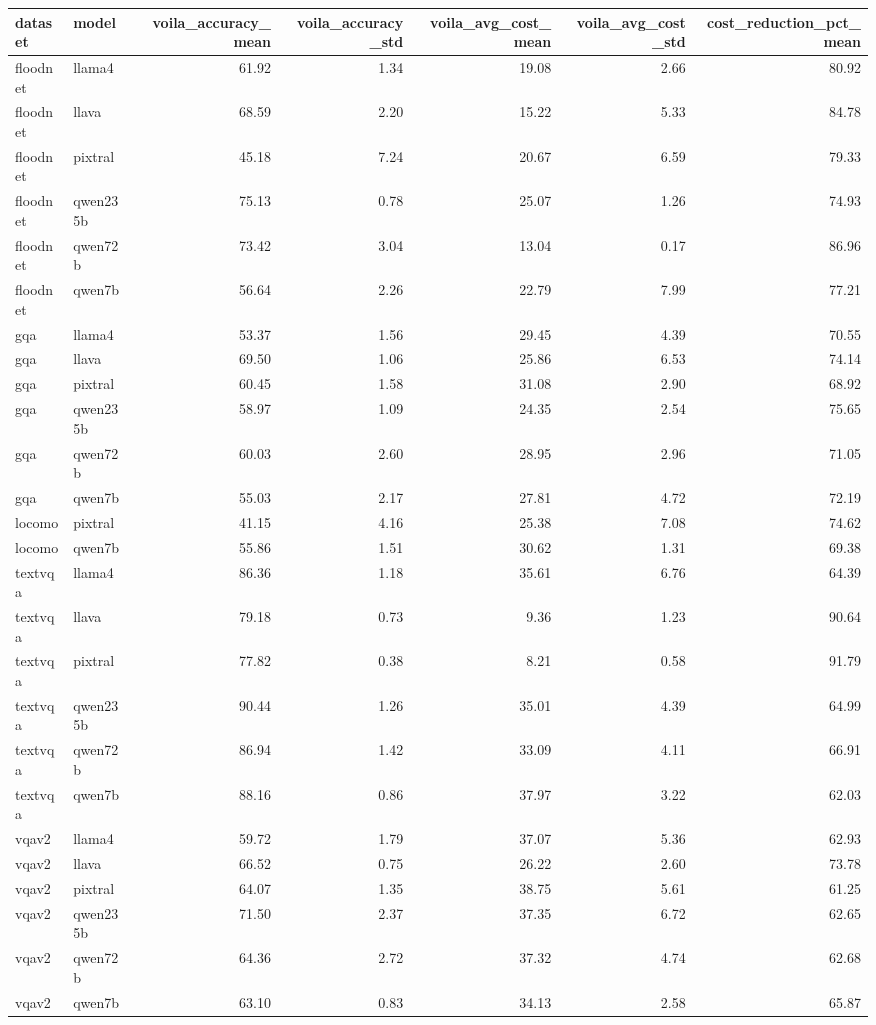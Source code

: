 \begin{tabular}{llrrrrr}
\toprule
dataset & model & voila_accuracy_mean & voila_accuracy_std & voila_avg_cost_mean & voila_avg_cost_std & cost_reduction_pct_mean \\
\midrule
floodnet & llama4 & 61.92 & 1.34 & 19.08 & 2.66 & 80.92 \\
floodnet & llava & 68.59 & 2.20 & 15.22 & 5.33 & 84.78 \\
floodnet & pixtral & 45.18 & 7.24 & 20.67 & 6.59 & 79.33 \\
floodnet & qwen235b & 75.13 & 0.78 & 25.07 & 1.26 & 74.93 \\
floodnet & qwen72b & 73.42 & 3.04 & 13.04 & 0.17 & 86.96 \\
floodnet & qwen7b & 56.64 & 2.26 & 22.79 & 7.99 & 77.21 \\
gqa & llama4 & 53.37 & 1.56 & 29.45 & 4.39 & 70.55 \\
gqa & llava & 69.50 & 1.06 & 25.86 & 6.53 & 74.14 \\
gqa & pixtral & 60.45 & 1.58 & 31.08 & 2.90 & 68.92 \\
gqa & qwen235b & 58.97 & 1.09 & 24.35 & 2.54 & 75.65 \\
gqa & qwen72b & 60.03 & 2.60 & 28.95 & 2.96 & 71.05 \\
gqa & qwen7b & 55.03 & 2.17 & 27.81 & 4.72 & 72.19 \\
locomo & pixtral & 41.15 & 4.16 & 25.38 & 7.08 & 74.62 \\
locomo & qwen7b & 55.86 & 1.51 & 30.62 & 1.31 & 69.38 \\
textvqa & llama4 & 86.36 & 1.18 & 35.61 & 6.76 & 64.39 \\
textvqa & llava & 79.18 & 0.73 & 9.36 & 1.23 & 90.64 \\
textvqa & pixtral & 77.82 & 0.38 & 8.21 & 0.58 & 91.79 \\
textvqa & qwen235b & 90.44 & 1.26 & 35.01 & 4.39 & 64.99 \\
textvqa & qwen72b & 86.94 & 1.42 & 33.09 & 4.11 & 66.91 \\
textvqa & qwen7b & 88.16 & 0.86 & 37.97 & 3.22 & 62.03 \\
vqav2 & llama4 & 59.72 & 1.79 & 37.07 & 5.36 & 62.93 \\
vqav2 & llava & 66.52 & 0.75 & 26.22 & 2.60 & 73.78 \\
vqav2 & pixtral & 64.07 & 1.35 & 38.75 & 5.61 & 61.25 \\
vqav2 & qwen235b & 71.50 & 2.37 & 37.35 & 6.72 & 62.65 \\
vqav2 & qwen72b & 64.36 & 2.72 & 37.32 & 4.74 & 62.68 \\
vqav2 & qwen7b & 63.10 & 0.83 & 34.13 & 2.58 & 65.87 \\
\bottomrule
\end{tabular}
